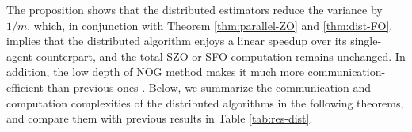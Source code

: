 \documentclass{article}
\def\vv{{\bm{v}}}
\def\vx{{\bm{x}}}
\def\mO{{\bm{O}}}
\def\gO{{\mathcal{O}}}
\def\sS{{\mathbb{S}}}
\newtheorem{thm}{Theorem}[section]
\newtheorem{lem}{Lemma}[section]
\theoremstyle{definition}
\newtheorem{dfn}{Definition}[section]
\theoremstyle{remark}
\begin{document}
	The proposition shows that the distributed estimators reduce the variance by $1/m$, which, in conjunction with Theorem \ref{thm:parallel-ZO} and \ref{thm:dist-FO}, implies that the distributed algorithm enjoys a linear speedup over its single-agent counterpart, and the total SZO or SFO computation remains unchanged. In addition, the low depth of NOG method makes it much more communication-efficient than 
	previous ones \citep{lin2024decentralized,sahinoglu2024online}. Below, we summarize the communication and computation complexities of the distributed algorithms in the following theorems, and compare them with previous results in Table \ref{tab:res-dist}.
	
	
	
	
	
	
		
	
\end{document}
